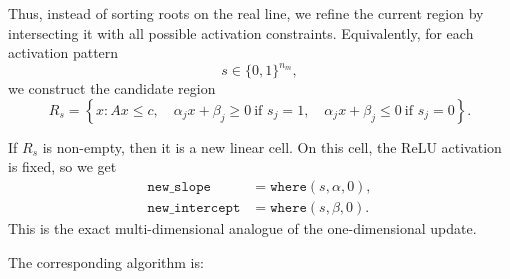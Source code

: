 \documentclass[10pt]{extarticle}
\begin{document}
Thus, instead of sorting roots on the real line, we refine the current region by intersecting it
with all possible activation constraints.  Equivalently, for each activation pattern
\[
s \in \{0,1\}^{n_m},
\]
we construct the candidate region
\begin{equation}
R_s =
\left\{
x :
A x \leq c,
\quad
\alpha_j x + \beta_j \geq 0 \ \text{if } s_j=1,
\quad
\alpha_j x + \beta_j \leq 0 \ \text{if } s_j=0
\right\}.
\end{equation}

If $R_s$ is non-empty, then it is a new linear cell.  On this cell, the ReLU activation is fixed,
so we get
\begin{align}
\texttt{new\_slope}
&= \texttt{where}(s, \alpha, 0), \\
\texttt{new\_intercept}
&= \texttt{where}(s, \beta, 0).
\end{align}
This is the exact multi-dimensional analogue of the one-dimensional update.

\newpage

The corresponding algorithm is:
\end{document}
